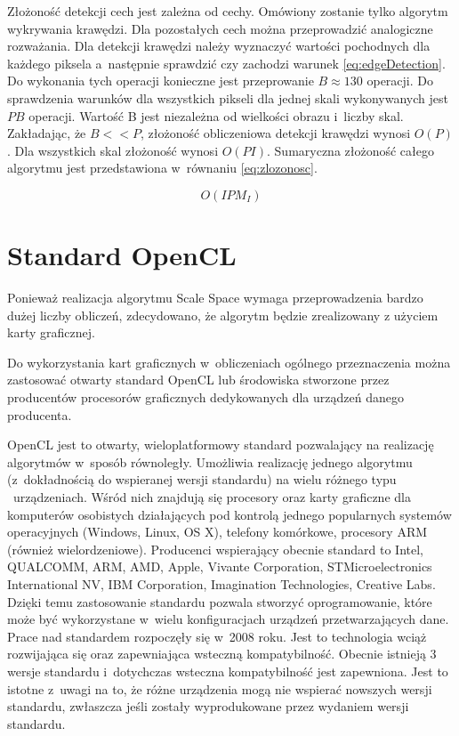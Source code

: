 Złożoność detekcji cech jest zależna od cechy. Omówiony zostanie tylko algorytm wykrywania krawędzi. Dla pozostałych cech można przeprowadzić analogiczne rozważania. Dla detekcji krawędzi należy wyznaczyć wartości pochodnych dla każdego piksela a~następnie sprawdzić czy zachodzi warunek \eqref{eq:edgeDetection}. Do wykonania tych operacji konieczne jest przeprowanie $ B \approx 130 $ operacji. Do sprawdzenia warunków dla wszystkich pikseli dla jednej skali wykonywanych jest $ P  B $ operacji. Wartość B jest niezależna od wielkości obrazu i~liczby skal. Zakładając, że $ B << P $, złożoność obliczeniowa detekcji krawędzi wynosi $ O(P) $. Dla wszystkich skal złożoność wynosi $ O (P  I) $. Sumaryczna złożoność całego algorytmu jest przedstawiona w~równaniu \eqref{eq:zlozonosc}.

\begin{equation}
\label{eq:zlozonosc}
O(I  P  M_I)
\end{equation}

\section{Standard OpenCL}
\label{sec:OpenCL}

Ponieważ realizacja algorytmu Scale Space wymaga przeprowadzenia bardzo dużej liczby obliczeń, zdecydowano, że algorytm będzie zrealizowany z użyciem karty graficznej.

Do wykorzystania kart graficznych w~obliczeniach ogólnego przeznaczenia można zastosować otwarty standard OpenCL lub środowiska stworzone przez producentów procesorów graficznych dedykowanych dla urządzeń danego producenta.

OpenCL jest to otwarty, wieloplatformowy standard pozwalający na realizację algorytmów w~sposób równoległy. Umożliwia realizację jednego algorytmu (z~dokładnością do wspieranej wersji standardu) na wielu różnego typu ~urządzeniach. Wśród nich znajdują się procesory oraz karty graficzne dla komputerów osobistych działających
 pod kontrolą jednego popularnych systemów operacyjnych (Windows, Linux, OS X), telefony komórkowe, procesory ARM (również wielordzeniowe). Producenci wspierający obecnie standard to Intel,
QUALCOMM,
ARM,
AMD,
Apple,
Vivante Corporation,
STMicroelectronics International NV,
IBM Corporation,
Imagination Technologies,
Creative Labs.
Dzięki temu zastosowanie standardu pozwala stworzyć oprogramowanie, które może być wykorzystane w~wielu konfiguracjach urządzeń przetwarzających dane. Prace nad standardem rozpoczęły się w~2008 roku. Jest to technologia wciąż rozwijająca się oraz zapewniająca wsteczną kompatybilność. Obecnie istnieją 3 wersje standardu i~dotychczas wsteczna kompatybilność jest zapewniona. Jest to istotne z~uwagi na to, że różne urządzenia mogą nie wspierać nowszych wersji standardu, zwłaszcza jeśli zostały wyprodukowane przez wydaniem wersji standardu.

